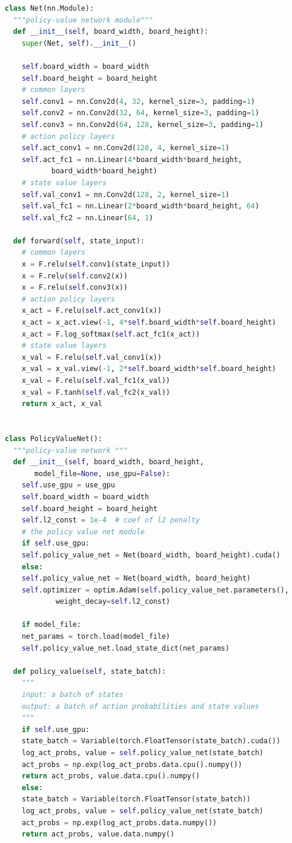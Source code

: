 \documentclass[a4paper]{article}
\begin{document}
\begin{multicols}{2}
\begin{lstlisting}[language=Python,breaklines = true,columns=flexible]
class Net(nn.Module):
  """policy-value network module"""
  def __init__(self, board_width, board_height):
    super(Net, self).__init__()

    self.board_width = board_width
    self.board_height = board_height
    # common layers
    self.conv1 = nn.Conv2d(4, 32, kernel_size=3, padding=1)
    self.conv2 = nn.Conv2d(32, 64, kernel_size=3, padding=1)
    self.conv3 = nn.Conv2d(64, 128, kernel_size=3, padding=1)
    # action policy layers
    self.act_conv1 = nn.Conv2d(128, 4, kernel_size=1)
    self.act_fc1 = nn.Linear(4*board_width*board_height,
           board_width*board_height)
    # state value layers
    self.val_conv1 = nn.Conv2d(128, 2, kernel_size=1)
    self.val_fc1 = nn.Linear(2*board_width*board_height, 64)
    self.val_fc2 = nn.Linear(64, 1)

  def forward(self, state_input):
    # common layers
    x = F.relu(self.conv1(state_input))
    x = F.relu(self.conv2(x))
    x = F.relu(self.conv3(x))
    # action policy layers
    x_act = F.relu(self.act_conv1(x))
    x_act = x_act.view(-1, 4*self.board_width*self.board_height)
    x_act = F.log_softmax(self.act_fc1(x_act))
    # state value layers
    x_val = F.relu(self.val_conv1(x))
    x_val = x_val.view(-1, 2*self.board_width*self.board_height)
    x_val = F.relu(self.val_fc1(x_val))
    x_val = F.tanh(self.val_fc2(x_val))
    return x_act, x_val


class PolicyValueNet():
  """policy-value network """
  def __init__(self, board_width, board_height,
       model_file=None, use_gpu=False):
    self.use_gpu = use_gpu
    self.board_width = board_width
    self.board_height = board_height
    self.l2_const = 1e-4  # coef of l2 penalty
    # the policy value net module
    if self.use_gpu:
    self.policy_value_net = Net(board_width, board_height).cuda()
    else:
    self.policy_value_net = Net(board_width, board_height)
    self.optimizer = optim.Adam(self.policy_value_net.parameters(),
            weight_decay=self.l2_const)

    if model_file:
    net_params = torch.load(model_file)
    self.policy_value_net.load_state_dict(net_params)

  def policy_value(self, state_batch):
    """
    input: a batch of states
    output: a batch of action probabilities and state values
    """
    if self.use_gpu:
    state_batch = Variable(torch.FloatTensor(state_batch).cuda())
    log_act_probs, value = self.policy_value_net(state_batch)
    act_probs = np.exp(log_act_probs.data.cpu().numpy())
    return act_probs, value.data.cpu().numpy()
    else:
    state_batch = Variable(torch.FloatTensor(state_batch))
    log_act_probs, value = self.policy_value_net(state_batch)
    act_probs = np.exp(log_act_probs.data.numpy())
    return act_probs, value.data.numpy()


\end{lstlisting}
\end{multicols}
\end{document}
